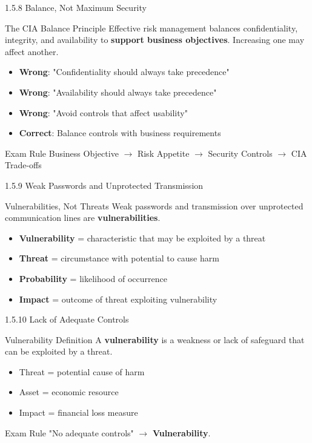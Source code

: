 \documentclass{beamer}
\begin{document}
	\begin{frame}{1.5.8 Balance, Not Maximum Security}
		\begin{block}{The CIA Balance Principle}
			Effective risk management balances confidentiality, integrity, and availability to \textbf{support business objectives}. Increasing one may affect another.
		\end{block}
		\begin{itemize}
			\item \textbf{Wrong}: "Confidentiality should always take precedence"
			\item \textbf{Wrong}: "Availability should always take precedence"
			\item \textbf{Wrong}: "Avoid controls that affect usability"
			\item \textbf{Correct}: Balance controls with business requirements
		\end{itemize}
		\begin{exampleblock}{Exam Rule}
			Business Objective $\rightarrow$ Risk Appetite $\rightarrow$ Security Controls $\rightarrow$ CIA Trade-offs
		\end{exampleblock}
	\end{frame}
	
	\begin{frame}{1.5.9 Weak Passwords and Unprotected Transmission}
		\begin{block}{Vulnerabilities, Not Threats}
			Weak passwords and transmission over unprotected communication lines are \textbf{vulnerabilities}.
		\end{block}
		\begin{itemize}
			\item \textbf{Vulnerability} = characteristic that may be exploited by a threat
			\item \textbf{Threat} = circumstance with potential to cause harm
			\item \textbf{Probability} = likelihood of occurrence
			\item \textbf{Impact} = outcome of threat exploiting vulnerability
		\end{itemize}
	\end{frame}
	
	\begin{frame}{1.5.10 Lack of Adequate Controls}
		\begin{block}{Vulnerability Definition}
			A \textbf{vulnerability} is a weakness or lack of safeguard that can be exploited by a threat.
		\end{block}
		\begin{itemize}
			\item Threat = potential cause of harm
			\item Asset = economic resource
			\item Impact = financial loss measure
		\end{itemize}
		\begin{exampleblock}{Exam Rule}
			"No adequate controls" $\rightarrow$ \textbf{Vulnerability}.
		\end{exampleblock}
	\end{frame}
	
\end{document}
